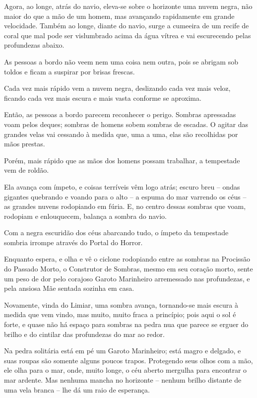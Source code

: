Agora, ao longe, atrás do navio, eleva-se sobre o horizonte uma nuvem
negra, não maior do que a mão de um homem, mas avançando rapidamente em
grande velocidade. Também ao longe, diante do navio, surge a cumeeira de
um recife de coral que mal pode ser vislumbrado acima da água vítrea e
vai escurecendo pelas profundezas abaixo.

As pessoas a bordo não veem nem uma coisa nem outra, pois se abrigam sob
toldos e ficam a suspirar por brisas frescas.

Cada vez mais rápido vem a nuvem negra, deslizando cada vez mais veloz,
ficando cada vez mais escura e mais vasta conforme se aproxima.

Então, as pessoas a bordo parecem reconhecer o perigo. Sombras
apressadas voam pelos deques; sombras de homens sobem sombras de
escadas. O agitar das grandes velas vai cessando à medida que, uma a
uma, elas são recolhidas por mãos prestas.

Porém, mais rápido que as mãos dos homens possam trabalhar, a tempestade
vem de roldão.

Ela avança com ímpeto, e coisas terríveis vêm logo atrás; escuro breu --
ondas gigantes quebrando e voando para o alto -- a espuma do mar
varrendo os céus -- as grandes nuvens rodopiando em fúria. E, no centro
dessas sombras que voam, rodopiam e enlouquecem, balança a sombra do
navio.

Com a negra escuridão dos céus abarcando tudo, o ímpeto da tempestade
sombria irrompe através do Portal do Horror.

Enquanto espera, e olha e vê o ciclone rodopiando entre as sombras na
Procissão do Passado Morto, o Construtor de Sombras, mesmo em seu
coração morto, sente um peso de dor pelo corajoso Garoto Marinheiro
arremessado nas profundezas, e pela ansiosa Mãe sentada sozinha em casa.

\smallskip
Novamente, vinda do Limiar, uma sombra avança, tornando-se mais escura à
medida que vem vindo, mas muito, muito fraca a princípio; pois aqui o
sol é forte, e quase não há espaço para sombras na pedra nua que parece
se erguer do brilho e do cintilar das profundezas do mar ao redor.

Na pedra solitária está em pé um Garoto Marinheiro; está magro e
delgado, e suas roupas são somente alguns poucos trapos. Protegendo seus
olhos com a mão, ele olha para o mar, onde, muito longe, o céu aberto
mergulha para encontrar o mar ardente. Mas nenhuma mancha no horizonte
-- nenhum brilho distante de uma vela branca -- lhe dá um raio de
esperança.

